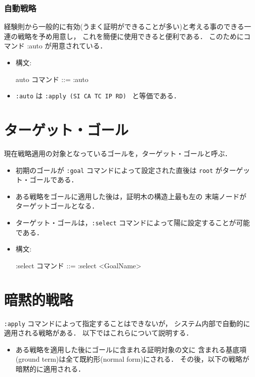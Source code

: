 \documentclass[a4paper,oneside,10pt,here]{memoir}
\newenvironment{vvtm}%
{\parskip=0pt\lineskip=0pt\begin{center}\begin{minipage}{0.8\textwidth}\begin{snugshade}}%
  {\end{snugshade}\end{minipage}\end{center}}
\begin{document}
\subsubsection{自動戦略} 
経験則から一般的に有効(うまく証明ができることが多い)と考える事のできる一連の戦略を予め用意し，
これを簡便に使用できると便利である．
このためにコマンド :auto が用意されている．

\begin{itemize}
\item 構文:
  \begin{vvtm}
    \begin{simplev}
  auto コマンド ::= :auto      
    \end{simplev}
  \end{vvtm}
\item \verb|:auto| は \verb|:apply (SI CA TC IP RD) | と等価である．
\end{itemize}

\section{ターゲット・ゴール}\label{sec:default-goal}
現在戦略適用の対象となっているゴールを，ターゲット・ゴールと呼ぶ．

\begin{itemize}
\item 初期のゴールが \verb|:goal| コマンドによって設定された直後は 
  \verb|root| がターゲット・ゴールである．
\item ある戦略をゴールに適用した後は，証明木の構造上最も左の
  末端ノードがターゲットゴールとなる．
\item ターゲット・ゴールは，\verb|:select| コマンドによって陽に設定することが可能である．
\item 構文:
  \begin{vvtm}
    \begin{simplev}
  :select コマンド ::= :select <GoalName>      
    \end{simplev}
  \end{vvtm}
\end{itemize}

\section{暗黙的戦略}\label{sec:implicit-tactic}
\verb|:apply| コマンドによって指定することはできないが，
システム内部で自動的に適用される戦略がある．
以下ではこれらについて説明する．

\begin{itemize}
\item ある戦略を適用した後にゴールに含まれる証明対象の文に
  含まれる基底項(ground term)は全て既約形(normal form)にされる．
  その後，以下の戦略が暗黙的に適用される．
\end{itemize}
\end{document}
